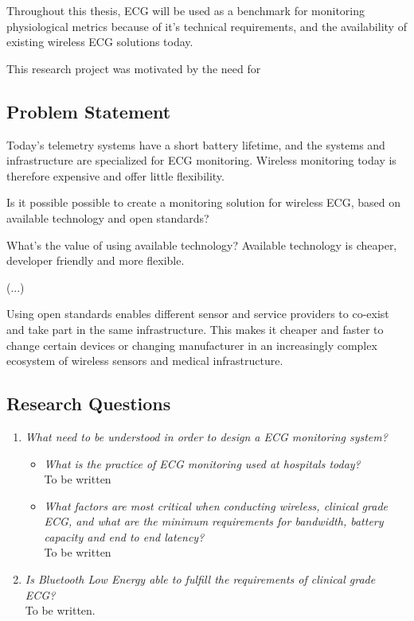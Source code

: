 Throughout this thesis, ECG will be used as a benchmark for monitoring physiological metrics because of it's technical requirements, and the availability of existing wireless ECG solutions today.

This research project was motivated by the need for 

\subsection{Problem Statement} 

\label{sub:problem_statement}

Today's telemetry systems have a short battery lifetime, and the systems and infrastructure are specialized for ECG monitoring. Wireless monitoring today is therefore expensive and offer little flexibility. 

Is it possible possible to create a monitoring solution for wireless ECG, based on available technology and open standards? 

What's the value of using available technology? Available technology is cheaper, developer friendly and more flexible.

(...)

Using open standards enables different sensor and service providers to co-exist and take part in the same infrastructure. This makes it cheaper and faster to change certain devices or changing manufacturer in an increasingly complex ecosystem of wireless sensors and medical infrastructure.

\subsection{Research Questions} 

\label{ssub:research_questions} 
\begin{enumerate}
	
	\item \textit{What need to be understood in order to design a ECG monitoring system?} 
	\begin{itemize}
		
		\item \textit{What is the practice of ECG monitoring used at hospitals today?}\\To be written
		
		\item \textit{What factors are most critical when conducting wireless, clinical grade ECG, and what are the minimum requirements for bandwidth, battery capacity and end to end latency?}\\To be written
	\end{itemize}
	
	\item \textit{Is Bluetooth Low Energy able to fulfill the requirements of clinical grade ECG?}\\To be written.
\end{enumerate}

